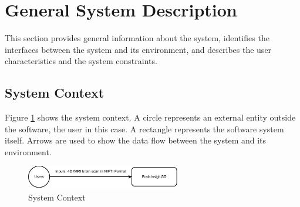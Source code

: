 \documentclass[12pt]{article}
\begin{document}
\section{General System Description}
This section provides general information about the system, identifies the
interfaces between the system and its environment, and describes the user
characteristics and the system constraints.


\subsection{System Context}

Figure \ref{SystemContext} shows the system context.  A circle represents an
external entity outside the software, the user in this case.  A rectangle
represents the software system itself.  Arrows are used to show the data
flow between the system and its environment.
\newline\newline\newline

\begin{figure}[h!]
  \begin{center}
    \includegraphics[width=0.6\textwidth]{SystemContext}
    \caption{System Context}
    \label{SystemContext}
  \end{center}
\end{figure}
\end{document}
